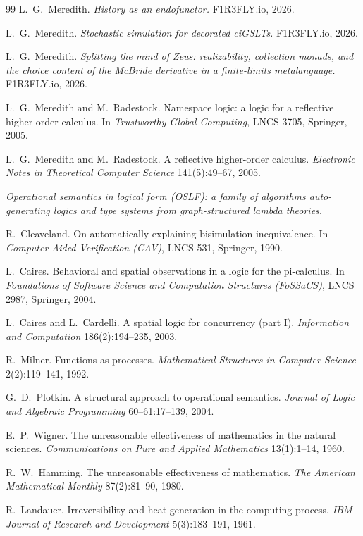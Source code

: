 \begin{thebibliography}{99}
L.\ G.\ Meredith. \emph{History as an endofunctor.} F1R3FLY.io, 2026.

L.\ G.\ Meredith. \emph{Stochastic simulation for decorated ciGSLTs.} F1R3FLY.io, 2026.

L.\ G.\ Meredith. \emph{Splitting the mind of Zeus: realizability, collection monads, and the choice content of the McBride derivative in a finite-limits metalanguage.} F1R3FLY.io, 2026.

L.\ G.\ Meredith and M.\ Radestock. Namespace logic: a logic for a reflective higher-order calculus. In \emph{Trustworthy Global Computing}, LNCS 3705, Springer, 2005.

L.\ G.\ Meredith and M.\ Radestock. A reflective higher-order calculus. \emph{Electronic Notes in Theoretical Computer Science} 141(5):49--67, 2005.

\emph{Operational semantics in logical form (OSLF): a family of algorithms auto-generating logics and type systems from graph-structured lambda theories.}

R.\ Cleaveland. On automatically explaining bisimulation inequivalence. In \emph{Computer Aided Verification (CAV)}, LNCS 531, Springer, 1990.

L.\ Caires. Behavioral and spatial observations in a logic for the pi-calculus. In \emph{Foundations of Software Science and Computation Structures (FoSSaCS)}, LNCS 2987, Springer, 2004.

L.\ Caires and L.\ Cardelli. A spatial logic for concurrency (part I). \emph{Information and Computation} 186(2):194--235, 2003.

R.\ Milner. Functions as processes. \emph{Mathematical Structures in Computer Science} 2(2):119--141, 1992.

G.\ D.\ Plotkin. A structural approach to operational semantics. \emph{Journal of Logic and Algebraic Programming} 60--61:17--139, 2004.

E.\ P.\ Wigner. The unreasonable effectiveness of mathematics in the natural sciences. \emph{Communications on Pure and Applied Mathematics} 13(1):1--14, 1960.

R.\ W.\ Hamming. The unreasonable effectiveness of mathematics. \emph{The American Mathematical Monthly} 87(2):81--90, 1980.

R.\ Landauer. Irreversibility and heat generation in the computing process. \emph{IBM Journal of Research and Development} 5(3):183--191, 1961.


\end{thebibliography}
